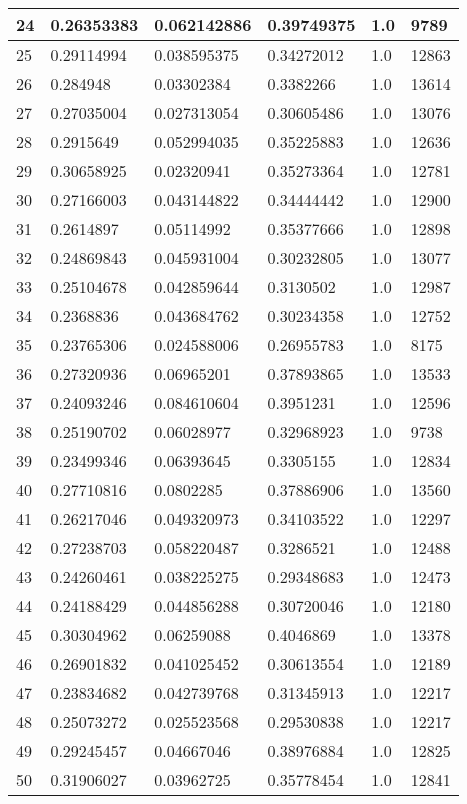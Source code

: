 \begin{longtable}{|l|l|l|l|l|l|}
24 & 0.26353383 & 0.062142886 & 0.39749375 & 1.0 & 9789 \\ \hline 
25 & 0.29114994 & 0.038595375 & 0.34272012 & 1.0 & 12863 \\ \hline 
26 & 0.284948 & 0.03302384 & 0.3382266 & 1.0 & 13614 \\ \hline 
27 & 0.27035004 & 0.027313054 & 0.30605486 & 1.0 & 13076 \\ \hline 
28 & 0.2915649 & 0.052994035 & 0.35225883 & 1.0 & 12636 \\ \hline 
29 & 0.30658925 & 0.02320941 & 0.35273364 & 1.0 & 12781 \\ \hline 
30 & 0.27166003 & 0.043144822 & 0.34444442 & 1.0 & 12900 \\ \hline 
31 & 0.2614897 & 0.05114992 & 0.35377666 & 1.0 & 12898 \\ \hline 
32 & 0.24869843 & 0.045931004 & 0.30232805 & 1.0 & 13077 \\ \hline 
33 & 0.25104678 & 0.042859644 & 0.3130502 & 1.0 & 12987 \\ \hline 
34 & 0.2368836 & 0.043684762 & 0.30234358 & 1.0 & 12752 \\ \hline 
35 & 0.23765306 & 0.024588006 & 0.26955783 & 1.0 & 8175 \\ \hline 
36 & 0.27320936 & 0.06965201 & 0.37893865 & 1.0 & 13533 \\ \hline 
37 & 0.24093246 & 0.084610604 & 0.3951231 & 1.0 & 12596 \\ \hline 
38 & 0.25190702 & 0.06028977 & 0.32968923 & 1.0 & 9738 \\ \hline 
39 & 0.23499346 & 0.06393645 & 0.3305155 & 1.0 & 12834 \\ \hline 
40 & 0.27710816 & 0.0802285 & 0.37886906 & 1.0 & 13560 \\ \hline 
41 & 0.26217046 & 0.049320973 & 0.34103522 & 1.0 & 12297 \\ \hline 
42 & 0.27238703 & 0.058220487 & 0.3286521 & 1.0 & 12488 \\ \hline 
43 & 0.24260461 & 0.038225275 & 0.29348683 & 1.0 & 12473 \\ \hline 
44 & 0.24188429 & 0.044856288 & 0.30720046 & 1.0 & 12180 \\ \hline 
45 & 0.30304962 & 0.06259088 & 0.4046869 & 1.0 & 13378 \\ \hline 
46 & 0.26901832 & 0.041025452 & 0.30613554 & 1.0 & 12189 \\ \hline 
47 & 0.23834682 & 0.042739768 & 0.31345913 & 1.0 & 12217 \\ \hline 
48 & 0.25073272 & 0.025523568 & 0.29530838 & 1.0 & 12217 \\ \hline 
49 & 0.29245457 & 0.04667046 & 0.38976884 & 1.0 & 12825 \\ \hline 
50 & 0.31906027 & 0.03962725 & 0.35778454 & 1.0 & 12841 \\ \hline 
\end{longtable}